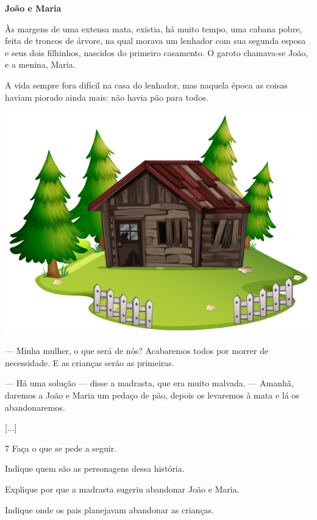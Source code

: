 \begin{myquote}
\textbf{João e Maria}

Às margens de uma extensa mata, existia, há muito tempo, uma cabana
pobre, feita de troncos de árvore, na qual morava um lenhador com sua segunda esposa e
seus dois filhinhos, nascidos do primeiro casamento. O garoto chamava-se João, e a
menina, Maria.

A vida sempre fora difícil na casa do lenhador, mas naquela época as
coisas haviam piorado ainda mais: não havia pão para todos.

\vspace{2ex}
\begin{center}
\noindent\includegraphics[width=\textwidth]{./media/image3a.png}
\end{center}

--- Minha mulher, o que será de nós? Acabaremos todos por morrer
de necessidade. E as crianças serão as primeiras.

--- Há uma solução --- disse a madrasta, que era muito
malvada. --- Amanhã, daremos a João e Maria um pedaço de pão, depois os
levaremos à mata e lá os abandonaremos.

{[}...{]}

\end{myquote}

\num{7} Faça o que se pede a seguir.

\begin{escolha}[itemsep=-5pt]
\item Indique quem são as personagens dessa história.

\item Explique por que a madrasta sugeriu abandonar João e Maria.

\pagebreak
\item Indique onde os pais planejavam abandonar as crianças.
\end{escolha}


